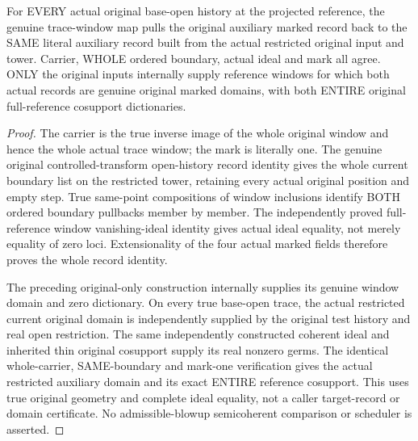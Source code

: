 \begin{theorem}
\label{hir:original-full-reference-auxiliary-marked-whole-open-identity}
\leanok
{}
For EVERY actual original base-open history at the projected reference,
the genuine trace-window map pulls the original auxiliary marked record
back to the SAME literal auxiliary record built from the actual restricted
original input and tower. Carrier, WHOLE ordered boundary, actual ideal and
mark all agree. ONLY the original inputs internally supply reference
windows for which both actual records are genuine original marked domains,
with both ENTIRE original full-reference cosupport dictionaries.
\end{theorem}
\begin{proof}
The carrier is the true inverse image of the whole original window and hence
the whole actual trace window; the mark is literally one. The genuine
original controlled-transform open-history record identity gives the whole
current boundary list on the restricted tower, retaining every actual
original position and empty step. True same-point compositions of window
inclusions identify BOTH ordered boundary pullbacks member by member.
The independently proved full-reference window vanishing-ideal identity
gives actual ideal equality, not merely equality of zero loci. Extensionality
of the four actual marked fields therefore proves the whole record identity.

The preceding original-only construction internally supplies its genuine
window domain and zero dictionary. On every true base-open trace, the actual
restricted current original domain is independently supplied by the original
test history and real open restriction. The same independently constructed
coherent ideal and inherited thin original cosupport supply its real
nonzero germs. The identical whole-carrier, SAME-boundary and mark-one
verification gives the actual restricted auxiliary domain and its exact
ENTIRE reference cosupport. This uses true original geometry and complete
ideal equality, not a caller target-record or domain certificate. No
admissible-blowup semicoherent comparison or scheduler is asserted.
\end{proof}
